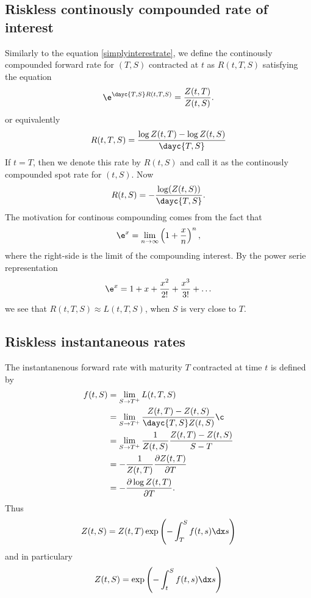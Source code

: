 \subsection{Riskless continously compounded rate of interest}
  
Similarly to the equation \ref{simplyinterestrate}, we define the continously compounded forward rate for $(T,S)$ contracted at $t$ as $R(t,T,S)$ satisfying the equation
  \begin{align}
   \e^{ \dayc{T,S} R(t,T,S)} = \frac{Z(t,T)}{Z(t,S)} .
  \end{align}
or equivalently
  \begin{align}
    R(t,T,S) = \frac{ \log Z(t,T) - \log Z(t,S) }{ \dayc{T,S} }
  \end{align}
If $t=T$, then we denote this rate by $R(t,S)$ and call it as the continously compounded spot rate for $(t,S)$. Now
  \begin{align}
    R(t,S) = - \frac{ \log (Z(t,S)) }{ \dayc{T,S} } .
  \end{align}
The motivation for continous compounding comes from the fact that
  \begin{align}
    \e^x = \lim_{n \rightarrow \infty} \left( 1 + \frac{x}{n} \right)^n,
  \end{align}
where the right-side is the limit of the compounding interest. By the power serie representation
  \begin{align}
    \e^x = 1 + x + \frac{x^2}{2!} + \frac{x^3}{3!} + \ldots
  \end{align}
we see that $R(t,T,S) \approx L(t,T,S)$, when $S$ is very close to $T$.

\subsection{Riskless instantaneous rates}
  
The instantanenous forward rate with maturity $T$ contracted at time $t$ is defined by
  \begin{align}
    f(t,S) &= \lim_{S \rightarrow T^+} L(t,T,S) \\
            &= \lim_{S \rightarrow T^+} \frac{Z(t,T) - Z(t,S)}{ \dayc{T,S}  Z(t,S)} ¸\\
            &= \lim_{S \rightarrow T^+} \frac{1}{ Z(t,S) } \frac{Z(t,T) - Z(t,S)}{ S-T } \\
            &= - \frac{1}{ Z(t,T) } \frac{ \partial Z(t,T) }{ \partial T } \\
            &= - \frac{ \partial \log Z(t,T) }{ \partial T } .
  \end{align}
Thus
  \begin{align}
    Z(t,S) = Z(t,T) \exp \left( - \int_T^S f(t,s) \dx s \right) \\
  \end{align}
and in particulary
  \begin{align}
    Z(t,S) = \exp \left( - \int_t^S f(t,s) \dx s \right) \\
  \end{align}

